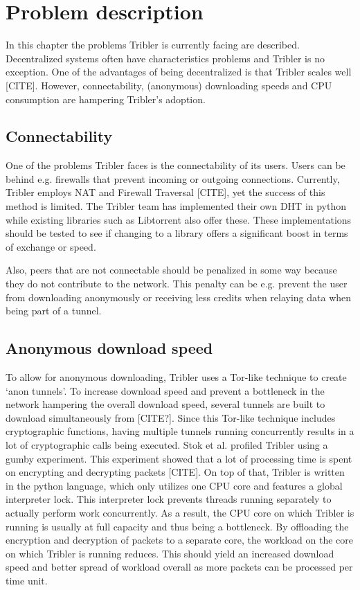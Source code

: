 \chapter{Problem description}
\label{chp:problem-description}
In this chapter the problems Tribler is currently facing are described.
Decentralized systems often have characteristics problems and Tribler is no exception.
One of the advantages of being decentralized is that Tribler scales well [CITE].
However, connectability, (anonymous) downloading speeds and CPU consumption are hampering Tribler's adoption.

\section{Connectability}
One of the problems Tribler faces is the connectability of its users.
Users can be behind e.g. firewalls that prevent incoming or outgoing connections.
Currently, Tribler employs NAT and Firewall Traversal [CITE], yet the success of this method is limited.
The Tribler team has implemented their own DHT in python while existing libraries such as Libtorrent also offer these.
These implementations should be tested to see if changing to a library offers a significant boost in terms of exchange or speed.

Also, peers that are not connectable should be penalized in some way because they do not contribute to the network.
This penalty can be e.g. prevent the user from downloading anonymously or receiving less credits when relaying data when being part of a tunnel.

\section{Anonymous download speed}
To allow for anonymous downloading, Tribler uses a Tor-like technique to create `anon tunnels'.
To increase download speed and prevent a bottleneck in the network hampering the overall download speed, several tunnels are built to download simultaneously from [CITE?].
Since this Tor-like technique includes cryptographic functions, having multiple tunnels running concurrently results in a lot of cryptographic calls being executed.
Stok et al. profiled Tribler using a gumby experiment. This experiment showed that a lot of processing time is spent on encrypting and decrypting packets [CITE].
On top of that, Tribler is written in the python language, which only utilizes one CPU core and features a global interpreter lock.
This interpreter lock prevents threads running separately to actually perform work concurrently.
As a result, the CPU core on which Tribler is running is usually at full capacity and thus being a bottleneck.
By offloading the encryption and decryption of packets to a separate core, the workload on the core on which Tribler is running reduces.
This should yield an increased download speed and better spread of workload overall as more packets can be processed per time unit.

